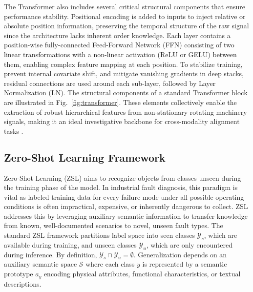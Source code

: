 The Transformer also includes several critical structural components that ensure performance stability. Positional encoding is added to inputs to inject relative or absolute position information, preserving the temporal structure of the raw signal since the architecture lacks inherent order knowledge. Each layer contains a position-wise fully-connected Feed-Forward Network (FFN) consisting of two linear transformations with a non-linear activation (ReLU or GELU) between them, enabling complex feature mapping at each position. To stabilize training, prevent internal covariate shift, and mitigate vanishing gradients in deep stacks, residual connections are used around each sub-layer, followed by Layer Normalization (LN). The structural components of a standard Transformer block are illustrated in Fig.~\ref{fig:transformer}. These elements collectively enable the extraction of robust hierarchical features from non-stationary rotating machinery signals, making it an ideal investigative backbone for cross-modality alignment tasks \cite{vaswani2017attention}.

\subsection{Zero-Shot Learning Framework}
Zero-Shot Learning (ZSL) aims to recognize objects from classes unseen during the training phase of the model. In industrial fault diagnosis, this paradigm is vital as labeled training data for every failure mode under all possible operating conditions is often impractical, expensive, or inherently dangerous to collect. ZSL addresses this by leveraging auxiliary semantic information to transfer knowledge from known, well-documented scenarios to novel, unseen fault types. The standard ZSL framework partitions label space into seen classes $\mathcal{Y}_s$, which are available during training, and unseen classes $\mathcal{Y}_u$, which are only encountered during inference. By definition, $\mathcal{Y}_s \cap \mathcal{Y}_u = \emptyset$. Generalization depends on an auxiliary semantic space $\mathcal{S}$ where each class $y$ is represented by a semantic prototype $a_y$ encoding physical attributes, functional characteristics, or textual descriptions.

